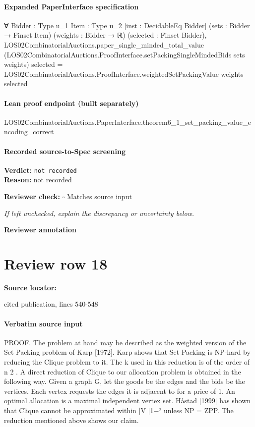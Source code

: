 \documentclass[10pt]{article}
\newcommand{\reviewerbox}{%
  \par\noindent\fbox{\parbox{0.96\linewidth}{\rule{0pt}{0.38in}}}\par
}
\newcommand{\reviewmatch}[1]{%
  \par\noindent\textbf{Reviewer check:} $\square$\; #1\par
  \noindent\emph{If left unchecked, explain the discrepancy or uncertainty below.}\par
}
\begin{document}
\paragraph{Expanded PaperInterface specification}
\begin{ReviewVerbatim}
∀ {Bidder : Type u_1} {Item : Type u_2} [inst : DecidableEq Bidder] (sets : Bidder → Finset Item) (weights : Bidder → ℝ)
  (selected : Finset Bidder),
  LOS02CombinatorialAuctions.paper_single_minded_total_value
      (LOS02CombinatorialAuctions.ProofInterface.setPackingSingleMindedBids sets weights) selected =
    LOS02CombinatorialAuctions.ProofInterface.weightedSetPackingValue weights selected
\end{ReviewVerbatim}

\paragraph{Lean proof endpoint (built separately)}\begin{ReviewVerbatim}
LOS02CombinatorialAuctions.PaperInterface.theorem6_1_set_packing_value_encoding_correct
\end{ReviewVerbatim}

\paragraph{Recorded source-to-Spec screening}
\textbf{Verdict:} \texttt{not recorded}
\\
\textbf{Reason:} not recorded
\reviewmatch{Matches source input}
\noindent\textbf{Reviewer annotation}\par
\reviewerbox
\clearpage
\hypertarget{source-claim-ff0c3f9034b08961}{}
\section*{Review row 18}
\textbf{Source locator:} {\footnotesize\raggedright cited publication, lines 540-\allowbreak{}548\par}
\paragraph{Verbatim source input}
\begin{ReviewVerbatim}
PROOF. The problem at hand may be described as the weighted version of the
Set Packing problem of Karp [1972]. Karp shows that Set Packing is NP-hard by
reducing the Clique problem to it. The k used in this reduction is of the order of n 2 .
A direct reduction of Clique to our allocation problem is obtained in the following
way. Given a graph G, let the goods be the edges and the bids be the vertices. Each
vertex requests the edges it is adjacent to for a price of 1. An optimal allocation
is a maximal independent vertex set. Håstad [1999] has shown that Clique cannot
be approximated within |V |1−² unless NP = ZPP. The reduction mentioned above
shows our claim.
\end{ReviewVerbatim}
\end{document}
